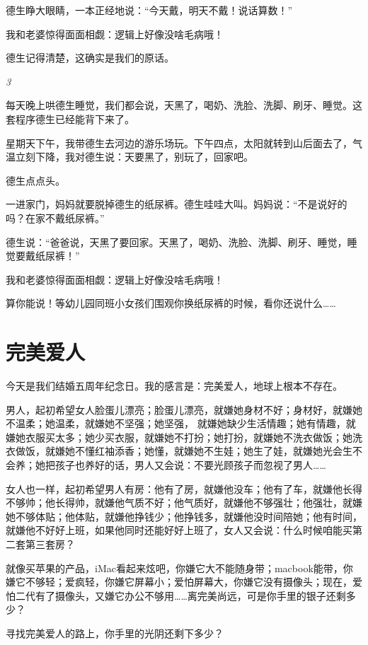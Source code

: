 \documentclass[twoside,openright,headings=optiontohead]{ctexbook} %
\begin{document}
{德生睁大眼睛，一本正经地说：``今天戴，明天不戴！说话算数！''

我和老婆惊得面面相觑：逻辑上好像没啥毛病哦！

德生记得清楚，这确实是我们的原话。

\emph{3}

每天晚上哄德生睡觉，我们都会说，天黑了，喝奶、洗脸、洗脚、刷牙、睡觉。这套程序德生已经能背下来了。

星期天下午，我带德生去河边的游乐场玩。下午四点，太阳就转到山后面去了，气温立刻下降，我对德生说：天要黑了，别玩了，回家吧。

德生点点头。

一进家门，妈妈就要脱掉德生的纸尿裤。德生哇哇大叫。妈妈说：``不是说好的吗？在家不戴纸尿裤。''

德生说：``爸爸说，天黑了要回家。天黑了，喝奶、洗脸、洗脚、刷牙、睡觉，睡觉要戴纸尿裤！''

我和老婆惊得面面相觑：逻辑上好像没啥毛病哦！

算你能说！等幼儿园同班小女孩们围观你换纸尿裤的时候，看你还说什么\ldots{}\ldots{}

\chapter*{完美爱人}\label{perfect-lover}

今天是我们结婚五周年纪念日。我的感言是：完美爱人，地球上根本不存在。

男人，起初希望女人脸蛋儿漂亮；脸蛋儿漂亮，就嫌她身材不好；身材好，就嫌她不温柔；她温柔，就嫌她不坚强；她坚强，
就嫌她缺少生活情趣；她有情趣，就嫌她衣服买太多；她少买衣服，就嫌她不打扮；她打扮，就嫌她不洗衣做饭；她洗衣做饭，就嫌她不懂红袖添香；她懂，就嫌她不生娃；她生了娃，就嫌她光会生不会养；她把孩子也养好的话，男人又会说：不要光顾孩子而忽视了男人\ldots{}\ldots{}

女人也一样，起初希望男人有房：他有了房，就嫌他没车；他有了车，就嫌他长得不够帅；他长得帅，就嫌他气质不好；他气质好，就嫌他不够强壮；他强壮，就嫌她不够体贴；他体贴，就嫌他挣钱少；他挣钱多，就嫌他没时间陪她；他有时间，就嫌他不好好上班，如果他同时还能好好上班了，女人又会说：什么时候咱能买第二套第三套房？

就像买苹果的产品，iMac看起来炫吧，你嫌它大不能随身带；macbook能带，你嫌它不够轻；爱疯轻，你嫌它屏幕小；爱怕屏幕大，你嫌它没有摄像头；现在，爱怕二代有了摄像头，又嫌它办公不够用\ldots{}\ldots{}离完美尚远，可是你手里的银子还剩多少？

寻找完美爱人的路上，你手里的光阴还剩下多少？

}
\end{document}
